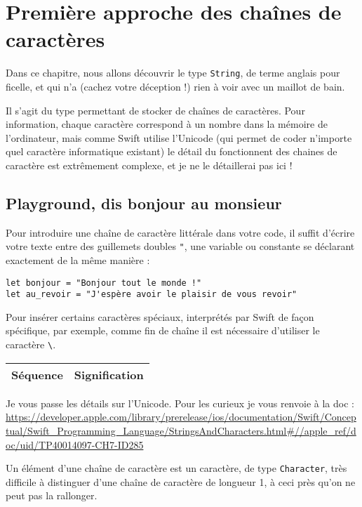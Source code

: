 \chapter{Première approche des chaînes de caractères}
Dans ce chapitre, nous allons découvrir le type \texttt{String}, de terme anglais pour ficelle, et qui n'a (cachez votre déception !) rien à voir avec un maillot de bain.

Il s'agit du type permettant de stocker de chaînes de caractères. Pour information, chaque caractère correspond à un nombre dans la mémoire de l'ordinateur, mais comme Swift utilise l'Unicode (qui permet de coder n'importe quel caractère informatique existant) le détail du fonctionnent des chaines de caractère est extrêmement complexe, et je ne le détaillerai pas ici !
\section{Playground, dis bonjour au monsieur}
Pour introduire une chaîne de caractère littérale dans votre code, il suffit d'écrire votre texte entre des guillemets doubles \verb'"', une variable ou constante se déclarant exactement de la même manière :
\begin{listing}[h]
\begin{verbatim}
let bonjour = "Bonjour tout le monde !"
let au_revoir = "J'espère avoir le plaisir de vous revoir"
\end{verbatim}
\end{listing}
Pour insérer certains caractères spéciaux, interprétés par Swift de façon spécifique, par exemple, comme fin de chaîne il est nécessaire d'utiliser le caractère \verb"\".
\begin{longtabu} to \linewidth {|X[1,l,m]|X[4,l,m]|}
\hline
Séquence & Signification \\ \hline
\endhead

\end{longtabu}

Je vous passe les détails sur l'Unicode. Pour les curieux je vous renvoie à la doc : \url{https://developer.apple.com/library/prerelease/ios/documentation/Swift/Conceptual/Swift_Programming_Language/StringsAndCharacters.html#//apple_ref/doc/uid/TP40014097-CH7-ID285}

Un élément d'une chaîne de caractère est un caractère, de type \texttt{Character}, très difficile à distinguer d'une chaîne de caractère de longueur 1, à ceci près qu'on ne peut pas la rallonger.
